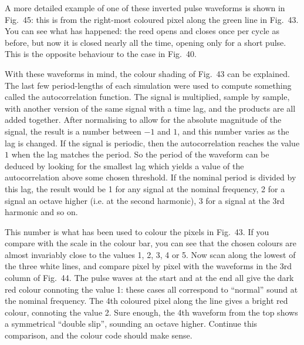 
  A more detailed example of one of these inverted pulse waveforms is shown in 
  Fig.\ 45: this is from the right-most coloured pixel along the green line in 
  Fig.\ 43. You can see what has happened: the reed opens and closes once per 
  cycle as before, but now it is closed nearly all the time, opening only for a 
  short pulse. This is the opposite behaviour to the case in Fig.\ 40. 


  With these waveforms in mind, the colour shading of Fig.\ 43 can be 
  explained. The last few period-lengths of each simulation were used to 
  compute something called the autocorrelation function. The signal is 
  multiplied, sample by sample, with another version of the same signal with a 
  time lag, and the products are all added together. After normalising to allow 
  for the absolute magnitude of the signal, the result is a number between $-1$ 
  and $1$, and this number varies as the lag is changed. If the signal is 
  periodic, then the autocorrelation reaches the value $1$ when the lag matches 
  the period. So the period of the waveform can be deduced by looking for the 
  smallest lag which yields a value of the autocorrelation above some chosen 
  threshold. If the nominal period is divided by this lag, the result would be 
  1 for any signal at the nominal frequency, 2 for a signal an octave higher 
  (i.e. at the second harmonic), 3 for a signal at the 3rd harmonic and so on. 

  This number is what has been used to colour the pixels in Fig.\ 43. If you 
  compare with the scale in the colour bar, you can see that the chosen colours 
  are almost invariably close to the values 1, 2, 3, 4 or 5. Now scan along the 
  lowest of the three white lines, and compare pixel by pixel with the 
  waveforms in the 3rd column of Fig.\ 44. The pulse waves at the start and at 
  the end all give the dark red colour connoting the value 1: these cases all 
  correspond to ``normal'' sound at the nominal frequency. The 4th coloured 
  pixel along the line gives a bright red colour, connoting the value 2. Sure 
  enough, the 4th waveform from the top shows a symmetrical “double slip”, 
  sounding an octave higher. Continue this comparison, and the colour code 
  should make sense. 

